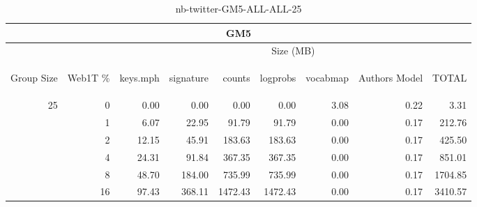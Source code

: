\begin{center}
\begin{table}[htbp] 
 \begin{center}
\begin{tabular}{ | r | r | r | r | r | r | r | r | r |}
\hline
\multicolumn{9}{|c|}{GM5}\\
\hline
 & & \multicolumn{7}{|c|}{Size (MB)}\\ \cline{3-9}
\begin{sideways}Group Size\end{sideways} & \begin{sideways}Web1T \% \end{sideways} & \begin{sideways}keys.mph\end{sideways} & \begin{sideways}signature\end{sideways} & \begin{sideways}counts\end{sideways} & \begin{sideways}logprobs\end{sideways} & \begin{sideways}vocabmap\end{sideways} & \begin{sideways}Authors Model \end{sideways} & \begin{sideways}TOTAL\end{sideways}\\
\hline
\multirow{5}{*}{25}
 & 0 & 0.00 & 0.00 & 0.00 & 0.00 & 3.08 & 0.22 & 3.31\\ \cline{2-9}
 & 1 & 6.07 & 22.95 & 91.79 & 91.79 & 0.00 & 0.17 & 212.76\\ \cline{2-9}
 & 2 & 12.15 & 45.91 & 183.63 & 183.63 & 0.00 & 0.17 & 425.50\\ \cline{2-9}
 & 4 & 24.31 & 91.84 & 367.35 & 367.35 & 0.00 & 0.17 & 851.01\\ \cline{2-9}
 & 8 & 48.70 & 184.00 & 735.99 & 735.99 & 0.00 & 0.17 & 1704.85\\ \cline{2-9}
 & 16 & 97.43 & 368.11 & 1472.43 & 1472.43 & 0.00 & 0.17 & 3410.57\\ \cline{2-9}
\hline
\end{tabular}
\caption{nb-twitter-GM5-ALL-ALL-25}
\label{table:nb-twitter-GM5-ALL-ALL-25}
\end{center}
 \end{table}
\end{center}

